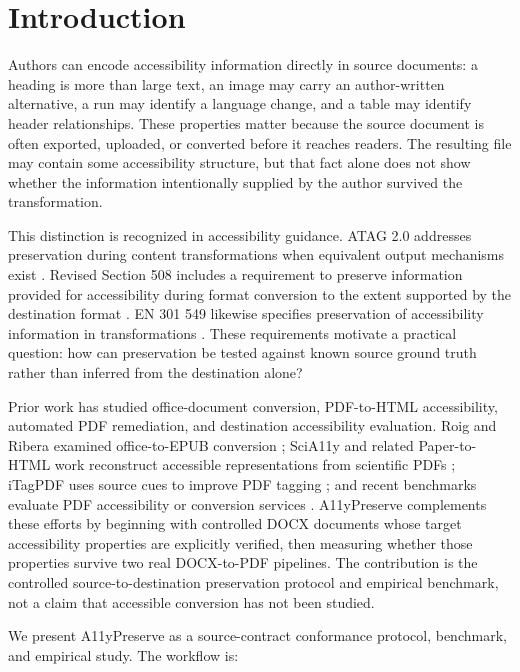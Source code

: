 \section{Introduction}
\label{sec:introduction}

Authors can encode accessibility information directly in source documents: a heading is more than large text, an image may carry an author-written alternative, a run may identify a language change, and a table may identify header relationships. These properties matter because the source document is often exported, uploaded, or converted before it reaches readers. The resulting file may contain some accessibility structure, but that fact alone does not show whether the information intentionally supplied by the author survived the transformation.

This distinction is recognized in accessibility guidance. ATAG 2.0 addresses preservation during content transformations when equivalent output mechanisms exist \cite{atag20}. Revised Section 508 includes a requirement to preserve information provided for accessibility during format conversion to the extent supported by the destination format \cite{section508}. EN 301 549 likewise specifies preservation of accessibility information in transformations \cite{etsi301549}. These requirements motivate a practical question: how can preservation be tested against known source ground truth rather than inferred from the destination alone?

Prior work has studied office-document conversion, PDF-to-HTML accessibility, automated PDF remediation, and destination accessibility evaluation. Roig and Ribera examined office-to-EPUB conversion \cite{roig2015}; SciA11y and related Paper-to-HTML work reconstruct accessible representations from scientific PDFs \cite{wang2021scia11y}; iTagPDF uses source cues to improve PDF tagging \cite{mowar2026}; and recent benchmarks evaluate PDF accessibility or conversion services \cite{kumar2025,daisy2026,docaccessible2026,docaccessible-google}. A11yPreserve complements these efforts by beginning with controlled DOCX documents whose target accessibility properties are explicitly verified, then measuring whether those properties survive two real DOCX-to-PDF pipelines. The contribution is the controlled source-to-destination preservation protocol and empirical benchmark, not a claim that accessible conversion has not been studied.

We present A11yPreserve as a source-contract conformance protocol, benchmark, and empirical study. The workflow is:

